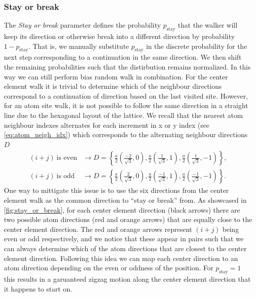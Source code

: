 \begin{figure}[H]
     \label{fig:bias_prob}
\end{figure}


\subsubsection{Stay or break}
The \textit{Stay or break} parameter defines the probability
$p_{\text{stay}}$ that the walker will keep its direction or otherwise break
into a different direction by probability $1-p_{\text{stay}}$. That is, we
manually substitute $p_{\text{stay}}$ in the discrete probability for the next
step corresponding to a continuation in the same direction. We then  shift the
remaining probabilities such that the distirbution remains normalized. In this
way we can still perform bias random walk in combination. For the center element
walk it is trivial to determine which of the neighbour directions correspond to
a continuation of direction based on the last visited site. However, for an atom site walk, it is not possible to follow the same direction in a straight line due to the hexagonal layout of the lattice. We recall that the
nearest atom neighbour indexes alternates for each increment in x or y index (see \cref{eq:atom_neigh_idx}) which corresponds to the alternating neighbour directions $D$
\begin{align*}
  (i + j) \ \text{is even} &\rightarrow D = \left\{ \frac{a}{2}\left(\frac{-2}{\sqrt{3}}, 0\right), \frac{a}{2}\left(\frac{1}{\sqrt{3}}, 1\right), \frac{a}{2}\left(\frac{1}{\sqrt{3}}, -1\right)\right\}, \\
  (i + j) \ \text{is odd} &\rightarrow D = \left\{ \frac{a}{2}\left(\frac{2}{\sqrt{3}}, 0\right), \frac{a}{2}\left(\frac{-1}{\sqrt{3}}, 1\right), \frac{a}{2}\left(\frac{-1}{\sqrt{3}}, -1\right)\right\}.
\end{align*}
One way to mittigate this issue is to use the six directions from the center element walk as the common direction to ``stay or break'' from. As showcased in \cref{fig:stay_or_break}, for each center element direction (black arrows) there are two possible atom directions (red and orange arrows) that are equally close to the center element direction. The red and orange arrows represent $(i+j)$ being even or odd respectively, and we notice that these appear in pairs such that we can always determine which of the atom directions that are closest to the center element direction. Following this idea we can map each center direction to an atom direction depending on the even or oddness of the position. For $p_{\text{stay}} = 1$ this results in a garuanteed zigzag motion along the center element direction that it happens to start on. 

